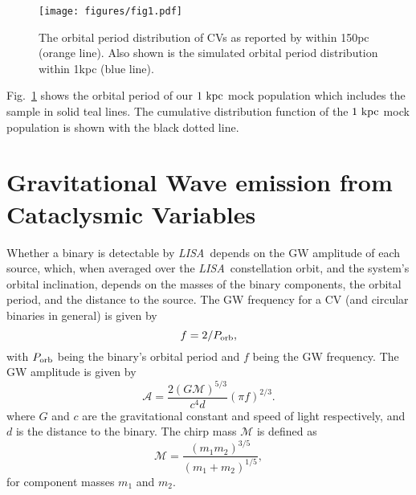 \documentclass[fleqn,usenatbib]{mnras}
\newcommand{\lisa}{{\it LISA}}
\begin{document}
\begin{figure}
	\texttt{[image: figures/fig1.pdf]}
    \caption{The orbital period distribution of CVs as reported by \citet{pala20} within 150pc (orange line). Also shown is the simulated orbital period distribution within 1kpc (blue line).}
    \label{fig:porb}
\end{figure}

Fig.~\ref{fig:porb} shows the 
orbital period of our $1~\rm{kpc}$ mock population which includes the \citet{pala20} sample in solid teal lines. The cumulative distribution function of the 
$1~\rm{kpc}$ mock population is shown with the black dotted line. 


\section{Gravitational Wave emission from Cataclysmic Variables} \label{sec:gwemission}

Whether a binary is detectable by \lisa\ depends on the GW amplitude of each source, which, when averaged over the \lisa\ constellation orbit, and the system's orbital inclination, depends on the masses of the binary components, the orbital period, and the distance to the source. The GW frequency for a CV (and circular binaries in general) is given by
\begin{equation}
    f = 2/P_{\rm orb},
\end{equation}
with $P_{\rm orb}$ being the binary's orbital period and $f$ being the GW frequency. The GW amplitude is given by
\begin{equation}\label{eqn:amp}
    \mathcal{A} = \frac{2 (G \mathcal{M})^{5/3} }{c^4 d} (\pi f)^{2/3}.
\end{equation}
where $G$ and $c$ are the gravitational constant and speed of light respectively, and $d$ is the distance to the binary. The chirp mass $\mathcal{M}$ is defined as
\begin{equation}\label{eqn:mchirp}
    \mathcal{M} = \frac{(m_1 m_2)^{3/5}}{(m_1 + m_2)^{1/5}}, 
\end{equation}
for component masses $m_1$ and $m_2$.
\end{document}
